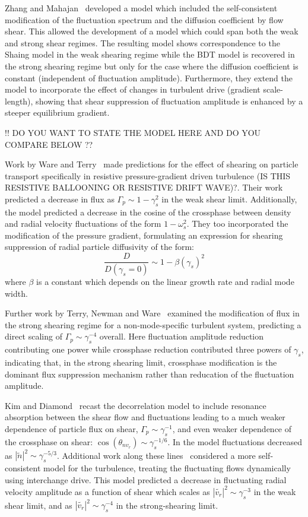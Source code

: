 \documentclass[aip,pop,amsmath,amssymb,preprint,superscriptaddress]{revtex4-1} %
\begin{document}
Zhang and Mahajan~\cite{zhang92,zhang93} developed a model which included the self-consistent modification of the fluctuation spectrum and the diffusion coefficient by flow shear.  This allowed the development of a model which could span both the weak and strong shear regimes.   The resulting model shows correspondence to the Shaing model in the weak shearing regime while the BDT model is recovered in the strong shearing regime but only for the case where the diffusion coefficient is constant (independent of fluctuation amplitude). Furthermore, they extend the model to incorporate the effect of changes in turbulent drive (gradient scale-length), showing that shear suppression of fluctuation amplitude is enhanced by a steeper equilibrium gradient. 

!! DO YOU WANT TO STATE THE MODEL HERE AND DO YOU COMPARE BELOW ??

Work by Ware and Terry~\cite{ware96,ware98} made predictions for the effect of shearing on particle transport specifically in resistive pressure-gradient driven turbulence  (IS THIS RESISTIVE BALLOONING OR RESISTIVE DRIFT WAVE)?. Their work predicted a decrease in flux as $\Gamma_{p} \sim 1-\gamma_{s}^2$ in the weak shear limit.  Additionally,  the model predicted a decrease in the cosine of the crossphase between density and radial velocity fluctuations of the form $1-\omega_{s}^2$. They too incorporated the modification of the pressure gradient, formulating an expression for shearing suppression of radial particle diffusivity of the form:
%
\begin{equation}
\frac{D}{D(\gamma_{s}=0)} \sim 1-\beta(\gamma_{s})^2
\label{eq:ware_diff_theory}
\end{equation}
%
where $\beta$ is a constant which depends on the linear growth rate and radial mode width.

Further work by Terry, Newman and Ware~\cite{terry01} examined the modification of flux in the strong shearing regime for a non-mode-specific turbulent system, predicting a direct scaling of $\Gamma_{p} \sim \gamma_{s}^{-4}$ overall.  Here fluctuation amplitude reduction contributing one power while crossphase reduction contributed three powers of $\gamma_s$, indicating that, in the strong shearing limit, crossphase modification is the dominant flux suppression mechanism rather than reducation of the fluctuation amplitude. 

Kim and Diamond~\cite{kim03} recast the decorrelation model to include resonance absorption between the shear flow and fluctuations leading to a much weaker dependence of particle flux on shear, $\Gamma_{p} \sim \gamma_{s}^{-1}$, and even weaker dependence of the crossphase on shear: $\cos(\theta_{nv_{r}}) \sim \gamma_{s}^{-1/6}$.  In the model fluctuations decreased as $|\tilde{n}|^{2} \sim \gamma_{s}^{-5/3}$. Additional work along these lines~\cite{kim04} considered a more self-consistent model for the turbulence, treating the fluctuating flows dynamically using interchange drive.  This model predicted a decrease in fluctuating radial velocity amplitude as a function of shear which scales as $|\tilde{v_{r}}|^{2} \sim \gamma_{s}^{-3}$ in the weak shear limit, and as $|\tilde{v_{r}}|^{2} \sim \gamma_{s}^{-4}$ in the strong-shearing limit.
\end{document}
